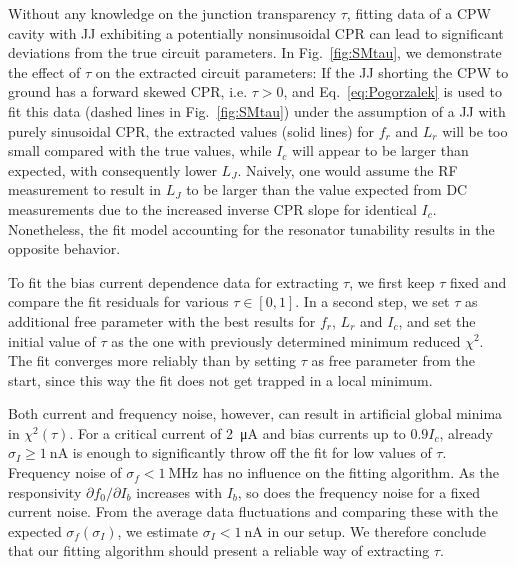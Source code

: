 Without any knowledge on the junction transparency $\tau$, fitting data of a CPW cavity with JJ exhibiting a potentially nonsinusoidal CPR can lead to significant deviations from the true circuit parameters.
%
In Fig.~\ref{fig:SMtau}, we demonstrate the effect of $\tau$ on the extracted circuit parameters:
%
If the JJ shorting the CPW to ground has a forward skewed CPR, i.e. $\tau>0$, and Eq.~\ref{eq:Pogorzalek} is used to fit this data (dashed lines in Fig.~\ref{fig:SMtau}) under the assumption of a JJ with purely sinusoidal CPR, the extracted values (solid lines) for $f_r$ and $L_r$ will be too small compared with the true values, while $I_c$ will appear to be larger than expected, with consequently lower $L_J$.
%
Naively, one would assume the RF measurement to result in $L_J$ to be larger than the value expected from DC measurements due to the increased inverse CPR slope for identical $I_c$.
%
Nonetheless, the fit model accounting for the resonator tunability results in the opposite behavior.

To fit the bias current dependence data for extracting $\tau$, we first keep $\tau$ fixed and compare the fit residuals for various $\tau\in[0,1]$.
%
In a second step, we set $\tau$ as additional free parameter with the best results for $f_r$, $L_r$ and $I_c$, and set the initial value of $\tau$ as the one with previously determined minimum reduced $\chi^2$.
%
The fit converges more reliably than by setting $\tau$ as free parameter from the start, since this way the fit does not get trapped in a local minimum.

Both current and frequency noise, however, can result in artificial global minima in $\chi^2(\tau)$.
%
For a critical current of \SI{2}{\micro\ampere} and bias currents up to $0.9I_c$, already $\sigma_I\geq\SI{1}{\nano\ampere}$ is enough to significantly throw off the fit for low values of $\tau$.
%
Frequency noise of $\sigma_f<\SI{1}{\mega\hertz}$ has no influence on the fitting algorithm.
%
As the responsivity $\partial f_0/\partial I_b$ increases with $I_b$, so does the frequency noise for a fixed current noise.
%
From the average data fluctuations and comparing these with the expected $\sigma_f(\sigma_I)$, we estimate $\sigma_I<\SI{1}{\nano\ampere}$ in our setup.
%
We therefore conclude that our fitting algorithm should present a reliable way of extracting $\tau$. 

